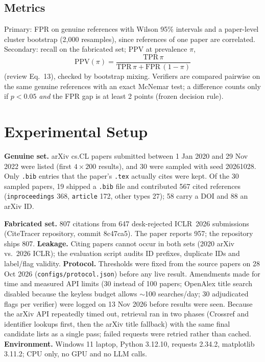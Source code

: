 \documentclass[conference]{IEEEtran}
\begin{document}
\subsection{Metrics}
Primary: FPR on genuine references with Wilson 95\% intervals and a paper-level cluster bootstrap
(2,000 resamples), since references of one paper are correlated. Secondary: recall on the
fabricated set; PPV at prevalence $\pi$,
\[ \mathrm{PPV}(\pi) = \frac{\mathrm{TPR}\,\pi}{\mathrm{TPR}\,\pi + \mathrm{FPR}\,(1-\pi)} \]
(review Eq.~13), checked by bootstrap mixing. Verifiers are compared pairwise on the same genuine
references with an exact McNemar test; a difference counts only if $p<0.05$ \emph{and} the FPR gap
is at least 2 points (frozen decision rule).

\section{Experimental Setup}
\textbf{Genuine set.} arXiv cs.CL papers submitted between 1 Jan 2020 and 29 Nov 2022 were
listed (first $4\times200$ results), and 30 were sampled with seed 20261028. Only \texttt{.bib}
entries that the paper's \texttt{.tex} actually cites were kept.
Of the 30 sampled papers, 19 shipped a \texttt{.bib} file and contributed 567 cited references
(\texttt{inproceedings} 368, \texttt{article} 172, other types 27); 58 carry a DOI and 88 an arXiv ID.

\textbf{Fabricated set.} 807 citations from 647 desk-rejected ICLR~2026 submissions
(CiteTracer repository, commit 8c47ca5). The paper reports 957; the repository ships 807.
\textbf{Leakage.} Citing papers cannot occur in both sets (2020 arXiv vs.\ 2026 ICLR); the
evaluation script audits ID prefixes, duplicate IDs and label/flag validity.
\textbf{Protocol.} Thresholds were fixed from the source papers on 28 Oct 2026
(\texttt{configs/protocol.json}) before any live result. Amendments made for time and measured
API limits (30 instead of 100 papers; OpenAlex title search disabled because the keyless budget
allows $\sim$100 searches/day; 30 adjudicated flags per verifier) were logged on 13 Nov 2026
before results were seen. Because the arXiv API repeatedly timed out, retrieval ran in two phases
(Crossref and identifier lookups first, then the arXiv title fallback) with the same final candidate
lists as a single pass; failed requests were retried rather than cached.
\textbf{Environment.} Windows 11 laptop, Python 3.12.10, requests 2.34.2, matplotlib 3.11.2;
CPU only, no GPU and no LLM calls.
\end{document}
